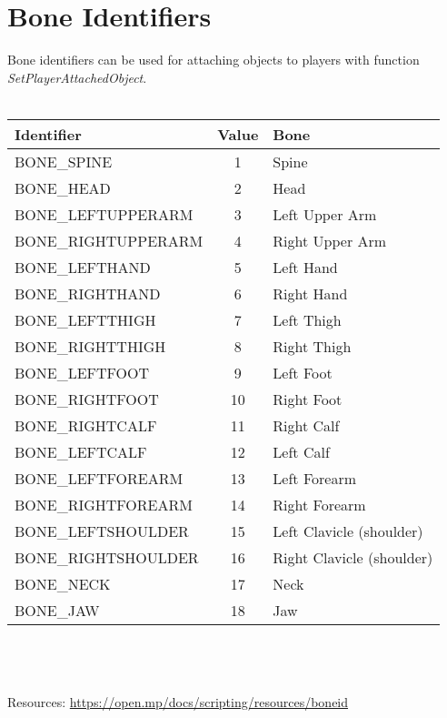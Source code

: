 \documentclass{article}
\begin{document}
\section{Bone Identifiers}
Bone identifiers can be used for attaching objects to players with function \textit{SetPlayerAttachedObject}.
\\
\\
\begin{tabular}{ |l|c|l| } 
\hline
Identifier & Value & Bone \\
\hline
BONE\_SPINE & 1 & Spine \\
BONE\_HEAD & 2 & Head \\
BONE\_LEFTUPPERARM & 3 & Left Upper Arm \\
BONE\_RIGHTUPPERARM & 4 & Right Upper Arm \\
BONE\_LEFTHAND & 5 & Left Hand \\
BONE\_RIGHTHAND & 6 & Right Hand \\
BONE\_LEFTTHIGH & 7 & Left Thigh \\
BONE\_RIGHTTHIGH & 8 & Right Thigh \\
BONE\_LEFTFOOT & 9 & Left Foot \\
BONE\_RIGHTFOOT & 10 & Right Foot \\
BONE\_RIGHTCALF & 11 & Right Calf \\
BONE\_LEFTCALF & 12 & Left Calf \\
BONE\_LEFTFOREARM & 13 & Left Forearm \\
BONE\_RIGHTFOREARM & 14 & Right Forearm \\
BONE\_LEFTSHOULDER & 15 & Left Clavicle (shoulder) \\
BONE\_RIGHTSHOULDER & 16 & Right Clavicle (shoulder) \\
BONE\_NECK & 17 & Neck \\
BONE\_JAW & 18 & Jaw \\
\hline
\end{tabular}
\\
\\
\\Resources: \url{https://open.mp/docs/scripting/resources/boneid}


\newpage
\end{document}
